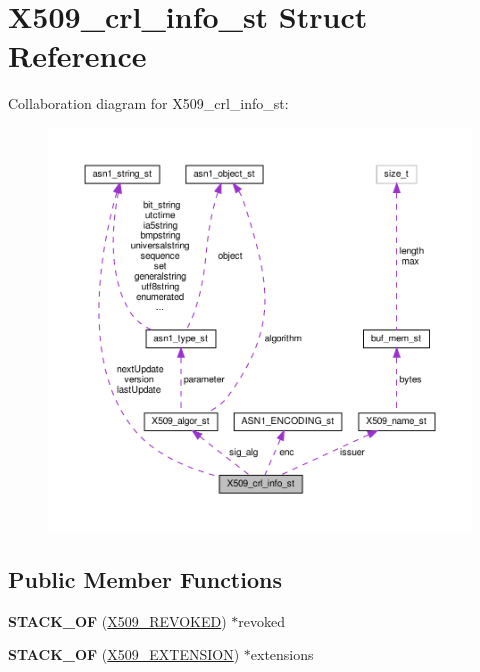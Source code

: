 \hypertarget{structX509__crl__info__st}{}\section{X509\+\_\+crl\+\_\+info\+\_\+st Struct Reference}
\label{structX509__crl__info__st}


Collaboration diagram for X509\+\_\+crl\+\_\+info\+\_\+st\+:
\nopagebreak
\begin{figure}[H]
\begin{center}
\leavevmode
\includegraphics[width=350pt]{structX509__crl__info__st__coll__graph}
\end{center}
\end{figure}
\subsection*{Public Member Functions}
\begin{DoxyCompactItemize}
\item 
\mbox{\label{structX509__crl__info__st_ab9897d2f018a6791c45ab9427ba06acf}} 
{\bfseries S\+T\+A\+C\+K\+\_\+\+OF} (\hyperlink{structx509__revoked__st}{X509\+\_\+\+R\+E\+V\+O\+K\+ED}) $\ast$revoked
\item 
\mbox{\label{structX509__crl__info__st_ad001fb81e73be4c52d5d52950c720e9c}} 
{\bfseries S\+T\+A\+C\+K\+\_\+\+OF} (\hyperlink{structX509__extension__st}{X509\+\_\+\+E\+X\+T\+E\+N\+S\+I\+ON}) $\ast$extensions
\end{DoxyCompactItemize}
